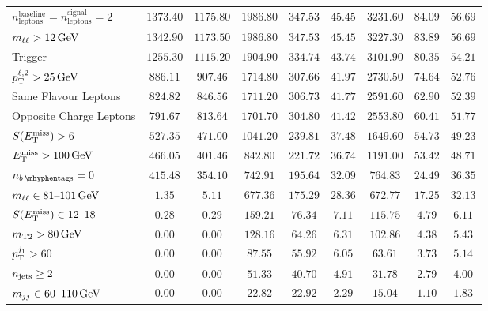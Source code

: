 \begin{sidewaystable}[tp]
{\begin{tabular}{lcccccccc}
$n_\mathrm{leptons}^\mathrm{baseline} = n_\mathrm{leptons}^\mathrm{signal} = 2$     & $1373.40$ & $1175.80$ & $1986.80$ & $347.53$ & $45.45$ & $3231.60$ & $84.09$ & $56.69$ \\
$\mll > 12\,\eV[G]$                                          & $1342.90$ & $1173.50$ & $1986.80$ & $347.53$ & $45.45$ & $3227.30$ & $83.89$ & $56.69$ \\
Trigger                                                   & $1255.30$ & $1115.20$ & $1904.90$ & $334.74$ & $43.74$ & $3101.90$ & $80.35$ & $54.21$ \\
$\pt^{\ell,2} > 25\,\eV[G]$                         & $886.11$ & $907.46$ & $1714.80$ & $307.66$ & $41.97$ & $2730.50$ & $74.64$ & $52.76$ \\
Same Flavour Leptons                                       & $824.82$ & $846.56$ & $1711.20$ & $306.73$ & $41.77$ & $2591.60$ & $62.90$ & $52.39$ \\
Opposite Charge Leptons                                   & $791.67$ & $813.64$ & $1701.70$ & $304.80$ & $41.42$ & $2553.80$ & $60.41$ & $51.77$ \\
$\metsig > 6$                                               & $527.35$ & $471.00$ & $1041.20$ & $239.81$ & $37.48$ & $1649.60$ & $54.73$ & $49.23$ \\
$\met > 100\,\eV[G]$                                           & $466.05$ & $401.46$ & $842.80$ & $221.72$ & $36.74$ & $1191.00$ & $53.42$ & $48.71$ \\
\hline
$\nbtag = 0$                                             & $415.48$ & $354.10$ & $742.91$ & $195.64$ & $32.09$ & $764.83$ & $24.49$ & $36.35$ \\
$\mll \in 81\text{--}101\,\eV[G]$                            & $1.35$ & $5.11$ & $677.36$ & $175.29$ & $28.36$ & $672.77$ & $17.25$ & $32.13$ \\
$\metsig \in 12\text{--}18$                               & $0.28$ & $0.29$ & $159.21$ & $76.34$ & $7.11$ & $115.75$ & $4.79$ & $6.11$ \\
$\mttwo > 80\,\eV[G]$                                        & $0.00$ & $0.00$ & $128.16$ & $64.26$ & $6.31$ & $102.86$ & $4.38$ & $5.43$ \\
$\pt^{j_1} > 60$                       & $0.00$ & $0.00$ & $87.55$ & $55.92$ & $6.05$ & $63.61$ & $3.73$ & $5.14$ \\
$\njet \geq 2$                               & $0.00$ & $0.00$ & $51.33$ & $40.70$ & $4.91$ & $31.78$ & $2.79$ & $4.00$ \\
$\mjj \in 60\text{--}110\,\eV[G]$                            & $0.00$ & $0.00$ & $22.82$ & $22.92$ & $2.29$ & $15.04$ & $1.10$ & $1.83$ \\

\end{tabular}}
\end{sidewaystable}
